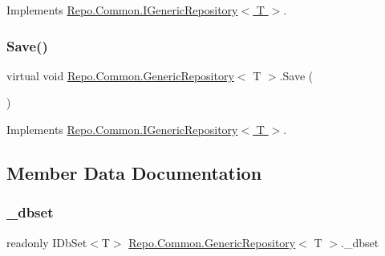Implements \hyperlink{interface_repo_1_1_common_1_1_i_generic_repository_a1ca337e6dced734d843e6955bc997ed0}{Repo.\+Common.\+I\+Generic\+Repository$<$ T $>$}.

\mbox{\label{class_repo_1_1_common_1_1_generic_repository_ab66ace5b2cc69867ce37dc996fc6c6e8}} 
\subsubsection{\texorpdfstring{Save()}{Save()}}
{\footnotesize\ttfamily virtual void \hyperlink{class_repo_1_1_common_1_1_generic_repository}{Repo.\+Common.\+Generic\+Repository}$<$ T $>$.Save (\begin{DoxyParamCaption}{ }\end{DoxyParamCaption})\hspace{0.3cm}{\ttfamily [virtual]}}



Implements \hyperlink{interface_repo_1_1_common_1_1_i_generic_repository_aff4307598aa9e4115d3baa2067d67647}{Repo.\+Common.\+I\+Generic\+Repository$<$ T $>$}.



\subsection{Member Data Documentation}
\mbox{\label{class_repo_1_1_common_1_1_generic_repository_a921e230c30c21f3adeb8f7ffd6345149}} 
\subsubsection{\texorpdfstring{\+\_\+dbset}{\_dbset}}
{\footnotesize\ttfamily readonly I\+Db\+Set$<$T$>$ \hyperlink{class_repo_1_1_common_1_1_generic_repository}{Repo.\+Common.\+Generic\+Repository}$<$ T $>$.\+\_\+dbset\hspace{0.3cm}{\ttfamily [protected]}}

